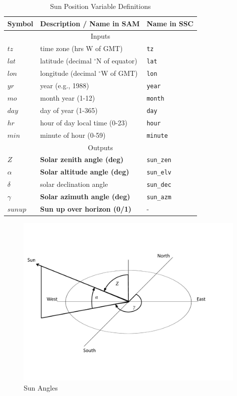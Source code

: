 \documentclass[12pt,letterpaper]{article}
\begin{document}
\begin{table}
\begin{center}
\caption{Sun Position Variable Definitions}
\begin{tabular}{lll}
\midrule
Symbol & Description / \textbf{Name in SAM} & Name in SSC\\
\midrule
\multicolumn{3}{c}{Inputs}\\
$\mathit{tz}$ & time zone (hrs W of GMT) & \texttt{tz}\\
$\mathit{lat}$ & latitude (decimal $^\circ$N of equator) & \texttt{lat}\\
$\mathit{lon}$ & longitude (decimal $^\circ$W of GMT) & \texttt{lon}\\
$\mathit{yr}$ & year (e.g., 1988) & \texttt{year}\\
$\mathit{mo}$ & month year (1-12) & \texttt{month}\\
$\mathit{day}$ & day of year (1-365) & \texttt{day}\\
$\mathit{hr}$ & hour of day local time (0-23) & \texttt{hour}\\
$\mathit{min}$ & minute of hour (0-59) & \texttt{minute}\\
\midrule
\multicolumn{3}{c}{Outputs}\\
$Z$ & \textbf{Solar zenith angle (deg)} & \texttt{sun\_zen}\\
$\alpha$ & \textbf{Solar altitude angle (deg)} & \texttt{sun\_elv}\\
$\delta$ & solar declination angle & \texttt{sun\_dec}\\
$\gamma$ & \textbf{Solar azimuth angle (deg)} & \texttt{sun\_azm}\\
$\mathit{sunup}$ & \textbf{Sun up over horizon (0/1)} & -\\
\midrule
\end{tabular}
\label{tab-sunposvars}
\end{center}
\end{table}

\begin{figure}
\begin{center}
\includegraphics[scale=0.6]{sun-angles}
\caption{Sun Angles}
\label{fig-sunangles}
\end{center}
\end{figure}
\end{document}
